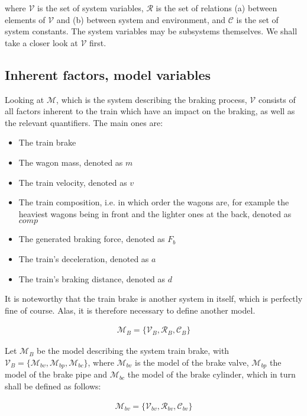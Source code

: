 \noindent
where ${\mathcal{V}}$ is the set of system variables, ${\mathcal{R}}$ is the set of relations (a) between elements of ${\mathcal{V}}$ and (b) between system and environment, and ${\mathcal{C}}$ is the set of system constants. The system variables may be subsystems themselves. We shall take a closer look at ${\mathcal{V}}$ first.

\subsection{Inherent factors, model variables}
\label{sec:InherentFactors}
\par\noindent
Looking at ${\mathcal{M}}$, which is the system describing the braking process, ${\mathcal{V}}$ consists of all factors inherent to the train which have an impact on the braking, as well as the relevant quantifiers. The main ones are:
\begin{itemize}
	\item The train brake
	\item The wagon mass, denoted as $m$
	\item The train velocity, denoted as $v$
	\item The train composition, i.e. in which order the wagons are, for example the heaviest wagons being in front and the lighter ones at the back, denoted as $comp$
	\item The generated braking force, denoted as $F_{b}$
	\item The train's deceleration, denoted as $a$
	\item The train's braking distance, denoted as $d$
\end{itemize}
\noindent
It is noteworthy that the train brake is another system in itself, which is perfectly fine of course. Alas, it is therefore necessary to define another model.

\begin{align*}
{\mathcal {M}}_{B} = \{ {\mathcal {V}}_{B}, {\mathcal {R}}_{B}, {\mathcal {C}}_{B} \}
\end{align*}

\noindent
Let ${\mathcal{M}}_{B}$ be the model describing the system train brake, with ${\mathcal {V}}_{B} = \{ {\mathcal {M}}_{bv}, {\mathcal {M}}_{bp}, {\mathcal {M}}_{bc} \}$, where ${\mathcal {M}}_{bv}$ is the model of the brake valve, ${\mathcal {M}}_{bp}$ the model of the brake pipe and ${\mathcal {M}}_{bc}$ the model of the brake cylinder, which in turn shall be defined as follows:

\begin{align*}
{\mathcal {M}}_{bv} = \{ {\mathcal {V}}_{bv}, {\mathcal {R}}_{bv}, {\mathcal {C}}_{bv} \}
\end{align*}

